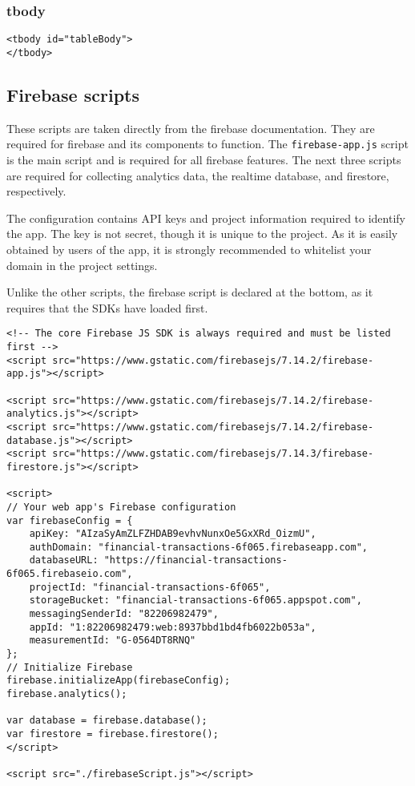 \documentclass[letterpaper]{article}
\begin{document}
\subsubsection{tbody}

\begin{lstlisting}[firstnumber=317]
<tbody id="tableBody">
</tbody>
\end{lstlisting}

\subsection{Firebase scripts}

These scripts are taken directly from the firebase documentation.
They are required for firebase and its components to function.
The \lstinline{firebase-app.js} script is the main script and is required for all firebase features.
The next three scripts are required for collecting analytics data, the realtime database, and firestore, respectively.

The configuration contains API keys and project information required to identify the app.
The key is not secret, though it is unique to the project.
As it is easily obtained by users of the app, it is strongly recommended to whitelist your domain in the project settings.

Unlike the other scripts, the firebase script is declared at the bottom, as it requires that the SDKs have loaded first.
\begin{lstlisting}[firstnumber=323]
<!-- The core Firebase JS SDK is always required and must be listed first -->
<script src="https://www.gstatic.com/firebasejs/7.14.2/firebase-app.js"></script>

<script src="https://www.gstatic.com/firebasejs/7.14.2/firebase-analytics.js"></script>
<script src="https://www.gstatic.com/firebasejs/7.14.2/firebase-database.js"></script>
<script src="https://www.gstatic.com/firebasejs/7.14.3/firebase-firestore.js"></script>

<script>
// Your web app's Firebase configuration
var firebaseConfig = {
    apiKey: "AIzaSyAmZLFZHDAB9evhvNunxOe5GxXRd_OizmU",
    authDomain: "financial-transactions-6f065.firebaseapp.com",
    databaseURL: "https://financial-transactions-6f065.firebaseio.com",
    projectId: "financial-transactions-6f065",
    storageBucket: "financial-transactions-6f065.appspot.com",
    messagingSenderId: "82206982479",
    appId: "1:82206982479:web:8937bbd1bd4fb6022b053a",
    measurementId: "G-0564DT8RNQ"
};
// Initialize Firebase
firebase.initializeApp(firebaseConfig);
firebase.analytics();

var database = firebase.database();
var firestore = firebase.firestore();
</script>

<script src="./firebaseScript.js"></script>
\end{lstlisting}
\end{document}
